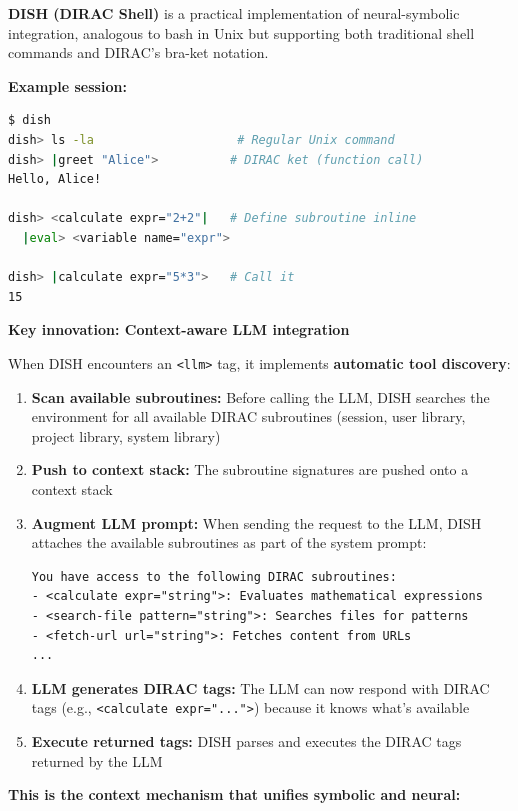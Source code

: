\documentclass[11pt,a4paper]{article}
\theoremstyle{definition}
\begin{document}
\textbf{DISH (DIRAC Shell)} is a practical implementation of neural-symbolic integration, analogous to bash in Unix but supporting both traditional shell commands and DIRAC's bra-ket notation.

\textbf{Example session:}
\begin{lstlisting}[language=bash]
$ dish
dish> ls -la                    # Regular Unix command
dish> |greet "Alice">          # DIRAC ket (function call)
Hello, Alice!

dish> <calculate expr="2+2"|   # Define subroutine inline
  |eval> <variable name="expr">

dish> |calculate expr="5*3">   # Call it
15
\end{lstlisting}

\textbf{Key innovation: Context-aware LLM integration}

When DISH encounters an \texttt{<llm>} tag, it implements \textbf{automatic tool discovery}:

\begin{enumerate}
\item \textbf{Scan available subroutines:} Before calling the LLM, DISH searches the environment for all available DIRAC subroutines (session, user library, project library, system library)

\item \textbf{Push to context stack:} The subroutine signatures are pushed onto a context stack

\item \textbf{Augment LLM prompt:} When sending the request to the LLM, DISH attaches the available subroutines as part of the system prompt:
\begin{lstlisting}
You have access to the following DIRAC subroutines:
- <calculate expr="string">: Evaluates mathematical expressions
- <search-file pattern="string">: Searches files for patterns
- <fetch-url url="string">: Fetches content from URLs
...
\end{lstlisting}

\item \textbf{LLM generates DIRAC tags:} The LLM can now respond with DIRAC tags (e.g., \texttt{<calculate expr="...">}) because it knows what's available

\item \textbf{Execute returned tags:} DISH parses and executes the DIRAC tags returned by the LLM
\end{enumerate}

\textbf{This is the context mechanism that unifies symbolic and neural:}
\end{document}
